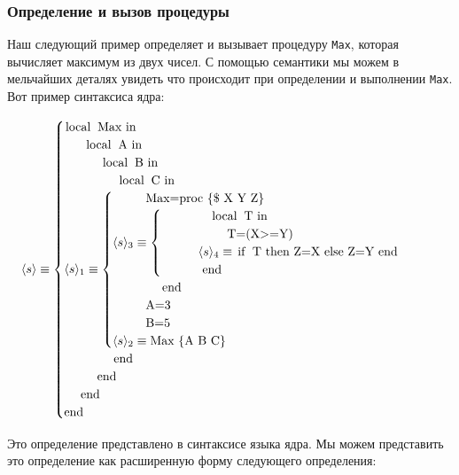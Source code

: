 \subsubsection{Определение и вызов процедуры}

Наш следующий пример определяет и вызывает процедуру \lstinline|Max|, которая вычисляет максимум из двух чисел. С помощью семантики мы можем в мельчайших деталях увидеть что происходит при определении и выполнении \lstinline|Max|. Вот пример синтаксиса ядра:

$$
\langle s \rangle \equiv \begin{cases}
  \text{\lstinline!local Max in!}\\
  \text{~~~~ \lstinline!local A in!}\\
  \text{~~~~~~~~ \lstinline!local B in!}\\
  \text{~~~~~~~~~~~~ \lstinline!local C in!}\\
  \langle s \rangle _1 \equiv \begin{cases}
    \text{~~~~~~~~\lstinline[mathescape=false]!Max=proc \{$ X Y Z\}!}\\
    \langle s \rangle _3 \equiv \begin{cases}
      \text{~~~~~~~~~~~~\lstinline!local T in!}\\
      \text{~~~~~~~~~~~~~~~~\lstinline!T=(X>=Y)!}\\
      \text{~~~~~~~~~} \langle s \rangle _4 \equiv \text{\lstinline!if T then Z=X else Z=Y end!}\\
      \text{~~~~~~~~~~\lstinline!end!}
    \end{cases}\\
    \text{~~~~~~~~~~~~\lstinline!end!}\\
    \text{~~~~~~~~\lstinline!A=3!}\\
    \text{~~~~~~~~\lstinline!B=5!}\\
    \langle s \rangle _2 \equiv \text{\lstinline!Max \{A B C\}!}\\
  \end{cases}\\
  \text{~~~~~~~~~~~~\lstinline!end!}\\
  \text{~~~~~~~~\lstinline!end!}\\
  \text{~~~~\lstinline!end!}\\
  \text{\lstinline!end!}
  \end{cases}
$$

Это определение представлено в синтаксисе языка ядра. Мы можем представить это определение как расширенную форму следующего определения:


